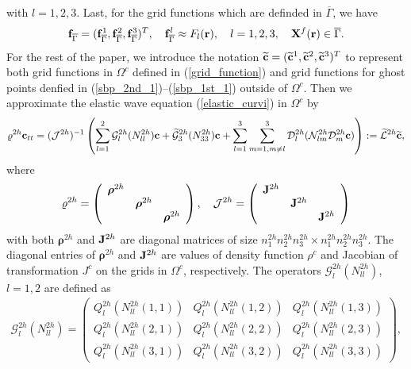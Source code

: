  with $l = 1,2,3$. Last, for the grid functions which are definded in $\overline{\Gamma}$, we have 
 \[{\bf f}_{\overline{\Gamma}} = ({\bf f}_{\overline{\Gamma}}^1, {\bf f}_{\overline{\Gamma}}^2, {\bf f}_{\overline{\Gamma}}^3)^T, \quad {\bf f}_{\overline{\Gamma}}^l\approx F_l({\bf r}), \quad l = 1,2,3, \quad {\bf X}^f({\bf r})\in\overline{\Gamma}.\]
 For the rest of the paper, we introduce the notation $\widetilde{\bf c} = (\widetilde{\bf c}^1,\widetilde{\bf c}^2,\widetilde{\bf c}^3)^T$ to represent both grid functions in $\Omega^c$ defined in (\ref{grid_function}) and grid functions for ghost points denfied in (\ref{sbp_2nd_1})--(\ref{sbp_1st_1}) outside of $\Omega^c$. Then we approximate the elastic wave equation (\ref{elastic_curvi}) in $\Omega^c$ by
\begin{equation}\label{elastic_semi_c}
{\varrho}^{2h} {\bf c}_{tt} =( \mathcal{ J}^{2h})^{-1}\left(\sum_{l=1}^2\mathcal{G}_l^{2h}({N}_{ll}^{2h}){\bf c}+\wt{\mathcal{G}}_3^{2h}({N}_{33}^{2h}){{\bf c}}+\sum_{l=1}^3\sum_{m=1,m\neq l}^3\mathcal{D}_l^{2h}(\mathcal{N}_{lm}^{2h}\mathcal{D}_m^{2h}{\bf c})\right) := \wt{\mathcal{L}}^{2h} \wt{{\bf c}},
\end{equation}
where 
\begin{align}\label{rho_j}
\varrho^{2h} = \left(\begin{array}{ccc}
{\bm \rho}^{2h}& ~  & ~ \\
~ & {\bm \rho}^{2h} & ~ \\
~ &~  &{\bm \rho}^{2h}\end{array}\right),\ \ \ \mathcal{J}^{2h} = \left(\begin{array}{ccc}
{\bf J}^{2h}& ~  & ~ \\
~ & {\bf J}^{2h} & ~ \\
~ &~  &{\bf J}^{2h}\end{array}\right)
\end{align}
with both ${\bm \rho}^{2h}$ and ${\bf J}^{2h}$ are diagonal matrices of size  $n_1^{2h}n_2^{2h}n_3^{2h}\times n_1^{2h}n_2^{2h}n_3^{2h}$. The diagonal entries of ${\bm \rho}^{2h}$ and ${\bf J}^{2h}$ are values of density function $\rho^c$ and Jacobian of transformation $J^c$ on the grids in $\Omega^c$, respectively.
The operators $\mathcal{G}_l^{2h}({N}_{ll}^{2h})$, $l=1,2$ are defined as
\begin{align*}\label{g1122}
\mathcal{G}^{2h}_l({N}_{ll}^{2h}) = \left(\begin{array}{ccc}
Q_l^{2h}(N_{ll}^{2h}(1,1)) & Q_l^{2h}(N_{ll}^{2h}(1,2))  & Q_l^{2h}(N_{ll}^{2h}(1,3)) \\
Q_l^{2h}(N_{ll}^{2h}(2,1)) & Q_l^{2h}(N_{ll}^{2h}(2,2))  & Q_l^{2h}(N_{ll}^{2h}(2,3)) \\
Q_l^{2h}(N_{ll}^{2h}(3,1)) & Q_l^{2h}(N_{ll}^{2h}(3,2))  & Q_l^{2h}(N_{ll}^{2h}(3,3)) \end{array}\right),
\end{align*}
